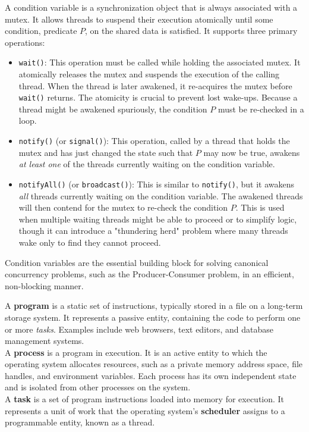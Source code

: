 A condition variable is a synchronization object that is always associated with a mutex. It allows threads to suspend their execution atomically until some condition, predicate $P$, on the shared data is satisfied. It supports three primary operations:
\begin{itemize}
    \item \texttt{wait()}: This operation must be called while holding the associated mutex. It atomically releases the mutex and suspends the execution of the calling thread. When the thread is later awakened, it re-acquires the mutex before \texttt{wait()} returns. The atomicity is crucial to prevent lost wake-ups. Because a thread might be awakened spuriously, the condition $P$ must be re-checked in a loop.
    \item \texttt{notify()} (or \texttt{signal()}): This operation, called by a thread that holds the mutex and has just changed the state such that $P$ may now be true, awakens \textit{at least one} of the threads currently waiting on the condition variable.
    \item \texttt{notifyAll()} (or \texttt{broadcast()}): This is similar to \texttt{notify()}, but it awakens \textit{all} threads currently waiting on the condition variable. The awakened threads will then contend for the mutex to re-check the condition $P$. This is used when multiple waiting threads might be able to proceed or to simplify logic, though it can introduce a "thundering herd" problem where many threads wake only to find they cannot proceed.
\end{itemize}
Condition variables are the essential building block for solving canonical concurrency problems, such as the Producer-Consumer problem, in an efficient, non-blocking manner.

A \textbf{program} is a static set of instructions, typically stored in a file on a long-term storage system. It represents a passive entity, containing the code to perform one or more \textit{tasks}. Examples include web browsers, text editors, and database management systems.\\
    
A \textbf{process} is a program in execution. It is an active entity to which the operating system allocates resources, such as a private memory address space, file handles, and environment variables. Each process has its own independent state and is isolated from other processes on the system.\\
    
A \textbf{task} is a set of program instructions loaded into memory for execution. It represents a unit of work that the operating system's \textbf{scheduler} assigns to a programmable entity, known as a thread.\\

